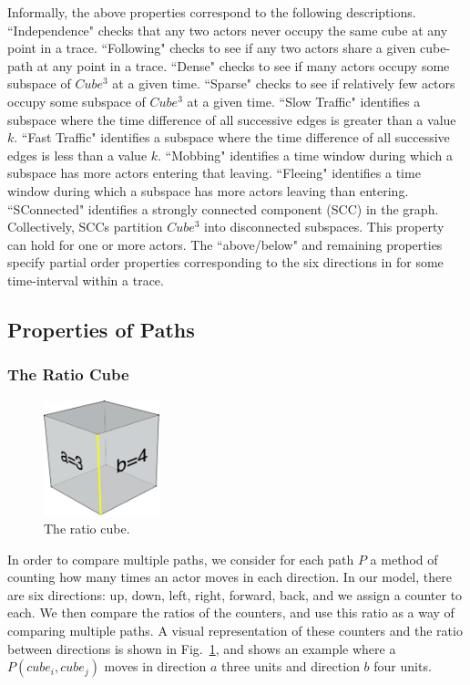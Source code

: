 Informally, the above properties correspond to the following descriptions.
``Independence" checks that any two actors never occupy the same cube at any point in a trace.
``Following" checks to see if any two actors share a given cube-path at any point in a trace.
``Dense" checks to see if many actors occupy some subspace of $Cube^3$ at a given time.
``Sparse" checks to see if relatively few actors occupy some subspace of $Cube^3$ at a given time.
``Slow Traffic" identifies a subspace where the time difference of all successive edges is greater than a value $k$. 
``Fast Traffic" identifies a subspace where the time difference of all successive edges is less than a value $k$. 
``Mobbing" identifies a time window during which a subspace has more actors entering that leaving. 
``Fleeing" identifies a time window during which a subspace has more actors leaving than entering. 
``SConnected" identifies a strongly connected component (SCC) in the graph.
Collectively, SCCs partition $Cube^3$ into disconnected subspaces.
This property can hold for one or more actors.
The ``above/below" and remaining properties specify partial order properties corresponding to the six directions in \rthree for some time-interval within a trace.

\subsection{Properties of Paths}
\subsubsection{The Ratio Cube}

\begin{figure}
  \centering
    \includegraphics[width=0.3\textwidth]{./figures/ratioCube_3_4}
      \caption{The ratio cube.}
      \label{fig:ratioCube}
\end{figure}
In order to compare multiple paths, we consider for each path $P$ a method of counting how many times an actor moves in each direction.  
In our model, there are six directions: up, down, left, right, forward, back, and we assign a counter to each.
We then compare the ratios of the counters, and use this ratio as a way of comparing multiple paths.
A visual representation of these counters and the ratio between directions is shown in Fig.~\ref{fig:ratioCube}, and shows an example where a $P(cube_i, cube_j)$ moves in direction $a$ three units and direction $b$ four units.

